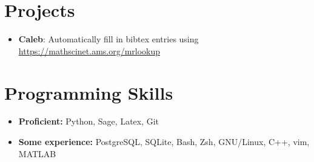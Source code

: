 \documentclass[letterpaper,11pt]{article}
\newcommand{\resumeItem}[2]{
  \item\small{
    \textbf{#1}{: #2 \vspace{-2pt}}
  }
}
\newcommand{\resumeSubItem}[2]{\resumeItem{#1}{#2}\vspace{-4pt}}
\newcommand{\resumeSubHeadingListStart}{\begin{itemize}[leftmargin=*]}
\newcommand{\resumeSubHeadingListEnd}{\end{itemize}}
\begin{document}
\section{Projects}
  \resumeSubHeadingListStart
    \resumeSubItem{Caleb}{Automatically fill in bibtex entries using
    \url{https://mathscinet.ams.org/mrlookup}}
  \resumeSubHeadingListEnd


\section{Programming Skills}
  \resumeSubHeadingListStart
    \item{
            \textbf{Proficient: }{Python, Sage, Latex, Git}
    }
    \item{
            \textbf{Some experience: }{PostgreSQL, SQLite, Bash, Zsh, GNU/Linux, C++, vim,
            MATLAB}
    }
  \resumeSubHeadingListEnd


\end{document}
